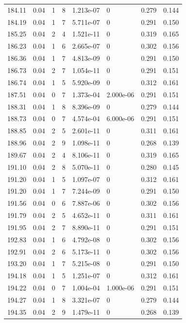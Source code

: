 \documentclass[preview]{standalone}
\begin{document}
{{{{{{{{\begin{tabular}{L{1.2cm}C{1.2cm} C{0.3cm}C{0.5cm} C{1.4cm}C{1.4cm} C{1.4cm}C{1.4cm}}
  184.11  &  0.04  & 1     &  8 &  1.213e-07  & 0  & 0.279 &  0.144   \\ 
  184.19  &  0.04  & 1     &  7 &  5.711e-07  & 0  & 0.291 &  0.150   \\ 
  185.25  &  0.04  & 2     &  4 &  1.521e-11  & 0  & 0.319 &  0.165   \\ 
  186.23  &  0.04  & 1     &  6 &  2.665e-07  & 0  & 0.302 &  0.156   \\ 
  186.36  &  0.04  & 1     &  7 &  4.813e-09  & 0  & 0.291 &  0.150   \\ 
  186.73  &  0.04  & 2     &  7 &  1.054e-11  & 0  & 0.291 &  0.151   \\ 
  186.74  &  0.04  & 1     &  5 &  5.920e-09  & 0  & 0.312 &  0.161   \\ 
  187.51  &  0.04  & 0     &  7 &  1.373e-04  & 2.000e-06  & 0.291 &  0.151   \\ 
  188.31  &  0.04  & 1     &  8 &  8.396e-09  & 0  & 0.279 &  0.144   \\ 
  188.73  &  0.04  & 0     &  7 &  4.574e-04  & 6.000e-06  & 0.291 &  0.151   \\ 
  188.85  &  0.04  & 2     &  5 &  2.601e-11  & 0  & 0.311 &  0.161   \\ 
  188.96  &  0.04  & 2     &  9 &  1.098e-11  & 0  & 0.268 &  0.139   \\ 
  189.67  &  0.04  & 2     &  4 &  8.106e-11  & 0  & 0.319 &  0.165   \\ 
  191.10  &  0.04  & 2     &  8 &  5.070e-11  & 0  & 0.280 &  0.145   \\ 
  191.20  &  0.04  & 1     &  5 &  1.097e-07  & 0  & 0.312 &  0.161   \\ 
  191.20  &  0.04  & 1     &  7 &  7.244e-09  & 0  & 0.291 &  0.150   \\ 
  191.56  &  0.04  & 0     &  6 &  7.887e-06  & 0  & 0.302 &  0.156   \\ 
  191.79  &  0.04  & 2     &  5 &  4.652e-11  & 0  & 0.311 &  0.161   \\ 
  191.95  &  0.04  & 2     &  7 &  8.890e-11  & 0  & 0.291 &  0.151   \\ 
  192.83  &  0.04  & 1     &  6 &  4.792e-08  & 0  & 0.302 &  0.156   \\ 
  192.91  &  0.04  & 2     &  6 &  5.173e-11  & 0  & 0.302 &  0.156   \\ 
  193.20  &  0.04  & 1     &  7 &  5.215e-08  & 0  & 0.291 &  0.150   \\ 
  194.18  &  0.04  & 1     &  5 &  1.251e-07  & 0  & 0.312 &  0.161   \\ 
  194.22  &  0.04  & 0     &  7 &  1.004e-04  & 1.000e-06  & 0.291 &  0.151   \\ 
  194.27  &  0.04  & 1     &  8 &  3.321e-07  & 0  & 0.279 &  0.144   \\ 
  194.35  &  0.04  & 2     &  9 &  1.479e-11  & 0  & 0.268 &  0.139   \\ 
\hline 
\end{tabular} 

}}}}}}}}
\end{document}
